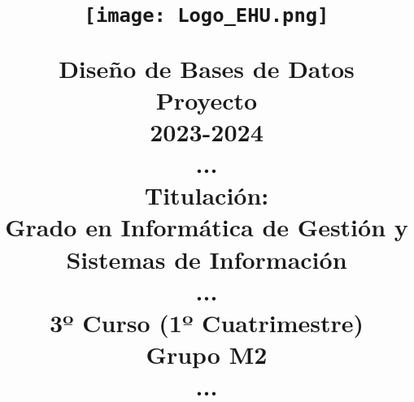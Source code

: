 \usepackage{graphicx} %
\usepackage{float}%
\graphicspath{ {images/} }

\title{%
    \begin{figure}[H]
        \centering
        \texttt{[image: Logo\_EHU.png]}
    \end{figure}
  \textbf{Diseño de Bases de Datos \\ Proyecto} \\
  \large{
            2023-2024\\
            ...\\
            \textbf{Titulación:}\\
            Grado en Informática de Gestión y Sistemas de Información\\
            ...\\
            3º Curso (1º Cuatrimestre)\\
            Grupo M2\\
            ...\\
            
    }
}